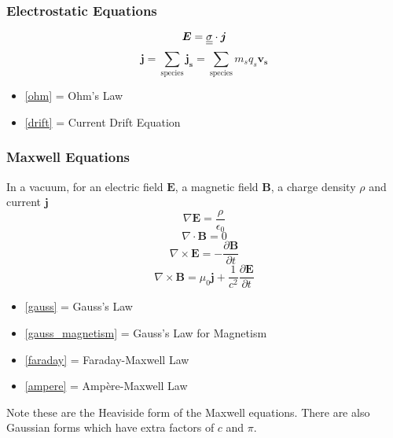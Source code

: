 \subsubsection{Electrostatic Equations}
\begin{equation}\label{ohm}
	\bm{E} = \underline{\underline{\sigma}} \cdot \bm{j}
\end{equation}
\begin{equation}\label{drift}
	\bm{j} = \sum_{\text{species}} \bm{j_s} = \sum_{\text{species}} m_s q_s \bm{v_s}
\end{equation}

\begin{itemize}
	\item [] \eqref{ohm} = Ohm's Law
	\item [] \eqref{drift} = Current Drift Equation
\end{itemize}

\subsubsection{Maxwell Equations}
In a vacuum, for an electric field $\bm{E}$, a magnetic field $\bm{B}$, a charge density $\rho$ and current $\bm{j}$
\begin{equation}\label{gauss}
	\nabla \bm{E} = \frac{\rho}{\epsilon_0}
\end{equation}
\begin{equation}\label{gauss_magnetism}
	\nabla \cdot \bm{B} = 0
\end{equation}
\begin{equation}\label{faraday}
	\nabla \times \bm{E} = -\frac{\partial \bm{B}}{\partial t}
\end{equation}
\begin{equation}\label{ampere}
	\nabla \times \bm{B} = \mu_0 \bm{j} + \frac{1}{c^2}\frac{\partial \bm{E}}{\partial t}
\end{equation}
\begin{itemize}
	\item[] \eqref{gauss} = Gauss's Law
	\item[] \eqref{gauss_magnetism} = Gauss's Law for Magnetism
	\item[] \eqref{faraday} = Faraday-Maxwell Law
	\item[] \eqref{ampere} = Amp\`ere-Maxwell Law
\end{itemize}
Note these are the Heaviside form of the Maxwell equations. There are also Gaussian forms which have extra factors of $c$ and $\pi$.

